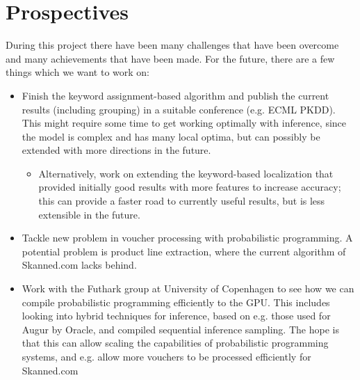 \documentclass[12pt,a4paper]{article}
\begin{document}
\section{Prospectives}
During this project there have been many challenges that have been overcome and
many achievements that have been made.
For the future, there are a few things which we want to work on:
\begin{itemize}
\item Finish the keyword assignment-based algorithm and publish the current
  results (including grouping) in a suitable conference (e.g. ECML PKDD). This
  might require some time to get working optimally with inference, since the
  model is complex and has many local optima, but can possibly be extended with
  more directions in the future.
  \begin{itemize}
  \item Alternatively, work on extending the
  keyword-based localization that provided initially good results with more
  features to increase accuracy; this can provide a faster road to currently useful
  results, but is less extensible in the future.
  \end{itemize}
\item Tackle new problem in voucher processing with probabilistic programming. A
  potential problem is product line extraction, where the current algorithm of
  Skanned.com lacks behind.
\item Work with the Futhark group at University of Copenhagen to see how we can
  compile probabilistic programming efficiently to the GPU. This includes
  looking into hybrid techniques for inference, based on e.g. those used for
  Augur by Oracle, and compiled sequential inference sampling. The hope is that
  this can allow scaling the capabilities of probabilistic programming systems,
  and e.g. allow more vouchers to be processed efficiently for Skanned.com
\end{itemize}

\medskip

\printbibliography[
heading=bibintoc,
title={Bibliography}
] 

\clearpage
\end{document}
